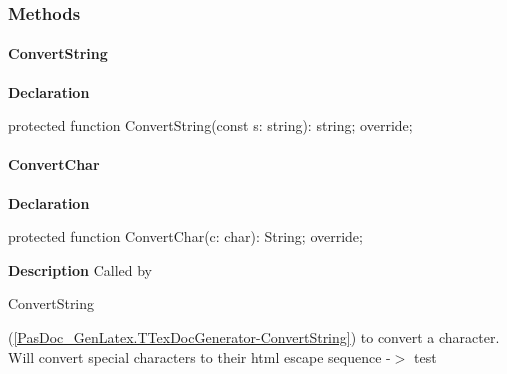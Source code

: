 \documentclass{report}
\newif\ifpdf
\begin{document}
\subsubsection*{\large{\textbf{Methods}}\normalsize\hspace{1ex}\hfill}
\paragraph*{ConvertString}\hspace*{\fill}

\label{PasDoc_GenLatex.TTexDocGenerator-ConvertString}
\begin{list}{}{
\setlength{\itemindent}{0cm}
\setlength{\listparindent}{0cm}
\setlength{\leftmargin}{\evensidemargin}
\addtolength{\leftmargin}{\tmplength}
\settowidth{\labelsep}{X}
\addtolength{\leftmargin}{\labelsep}
\setlength{\labelwidth}{\tmplength}
}
\item[\textbf{Declaration}\hfill]
\ifpdf
\begin{flushleft}
\fi
\begin{ttfamily}
protected function ConvertString(const s: string): string; override;\end{ttfamily}

\ifpdf
\end{flushleft}
\fi

\end{list}
\paragraph*{ConvertChar}\hspace*{\fill}

\label{PasDoc_GenLatex.TTexDocGenerator-ConvertChar}
\begin{list}{}{
\setlength{\itemindent}{0cm}
\setlength{\listparindent}{0cm}
\setlength{\leftmargin}{\evensidemargin}
\addtolength{\leftmargin}{\tmplength}
\settowidth{\labelsep}{X}
\addtolength{\leftmargin}{\labelsep}
\setlength{\labelwidth}{\tmplength}
}
\item[\textbf{Declaration}\hfill]
\ifpdf
\begin{flushleft}
\fi
\begin{ttfamily}
protected function ConvertChar(c: char): String; override;\end{ttfamily}

\ifpdf
\end{flushleft}
\fi

\par
\item[\textbf{Description}]
Called by \begin{ttfamily}ConvertString\end{ttfamily}(\ref{PasDoc_GenLatex.TTexDocGenerator-ConvertString}) to convert a character. Will convert special characters to their html escape sequence {-}{$>$} test

\end{list}
\end{document}
